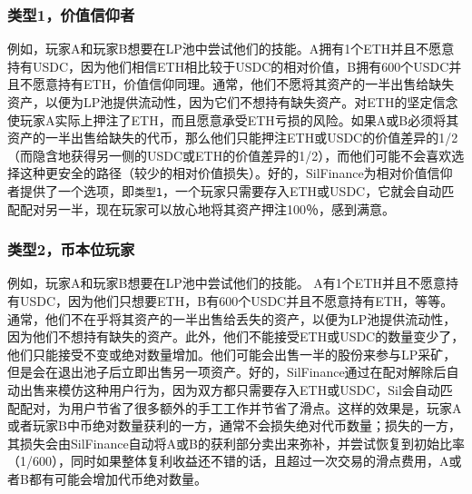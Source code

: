 \documentclass[11pt,letterpaper]{article}
\begin{document}
\begin{multicols}{2}
\subsubsection{类型1，价值信仰者}
例如，玩家A和玩家B想要在LP池中尝试他们的技能。A拥有1个ETH并且不愿意持有USDC，因为他们相信ETH相比较于USDC的相对价值，B拥有600个USDC并且不愿意持有ETH，价值信仰同理。通常，他们不愿将其资产的一半出售给缺失资产，以便为LP池提供流动性，因为它们不想持有缺失资产。对ETH的坚定信念使玩家A实际上押注了ETH，而且愿意承受ETH亏损的风险。如果A或B必须将其资产的一半出售给缺失的代币，那么他们只能押注ETH或USDC的价值差异的1/2（而隐含地获得另一侧的USDC或ETH的价值差异的1/2），而他们可能不会喜欢选择这种更安全的路径（较少的相对价值损失）。好的，SilFinance为相对价值信仰者提供了一个选项，即\texttt{类型1}，一个玩家只需要存入ETH或USDC，它就会自动匹配配对另一半，现在玩家可以放心地将其资产押注100％，感到满意。

\subsubsection{类型2，币本位玩家}
例如，玩家A和玩家B想要在LP池中尝试他们的技能。
 A有1个ETH并且不愿意持有USDC，因为他们只想要ETH，B有600个USDC并且不愿意持有ETH，等等。通常，他们不在乎将其资产的一半出售给丢失的资产，以便为LP池提供流动性，因为他们不想持有缺失的资产。此外，他们不能接受ETH或USDC的数量变少了，他们只能接受不变或绝对数量增加。他们可能会出售一半的股份来参与LP采矿，但是会在退出池子后立即出售另一项资产。好的，SilFinance通过在配对解除后自动出售来模仿这种用户行为，因为双方都只需要存入ETH或USDC，Sil会自动匹配配对，为用户节省了很多额外的手工工作并节省了滑点。这样的效果是，玩家A或者玩家B中币绝对数量获利的一方，通常不会损失绝对代币数量；损失的一方，其损失会由SilFinance自动将A或B的获利部分卖出来弥补，并尝试恢复到初始比率（1/600），同时如果整体复利收益还不错的话，且超过一次交易的滑点费用，A或者B都有可能会增加代币绝对数量。

\end{multicols}
\end{document}
